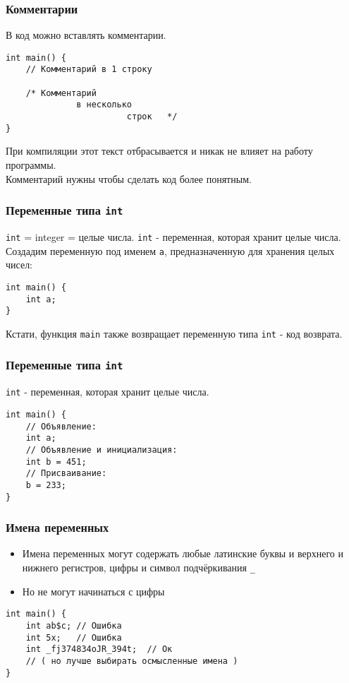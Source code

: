\documentclass[12pt,pdf,hyperref={unicode}]{beamer}
\begin{document}
\begin{frame}[fragile]
\frametitle{Комментарии}
В код можно вставлять комментарии.
\begin{lstlisting}
int main() {
	// Комментарий в 1 строку
	
	/* Комментарий
	          в несколько
	                    строк   */ 
}
\end{lstlisting}
При компиляции этот текст отбрасывается и никак не влияет на работу программы. \\
Комментарий нужны чтобы сделать код более понятным.
\end{frame}

\begin{frame}[fragile]
\frametitle{Переменные типа \texttt{int}}
\texttt{int} = integer = целые числа.
\texttt{int} - переменная, которая хранит целые числа. \\
Создадим переменную под именем \texttt{a}, предназначенную для хранения целых чисел: \\
\begin{lstlisting}
int main() {
    int a; 
}
\end{lstlisting}
Кстати, функция \texttt{main} также возвращает переменную типа \texttt{int} - код возврата.
\end{frame}

\begin{frame}[fragile]
\frametitle{Переменные типа \texttt{int}}
\texttt{int} - переменная, которая хранит целые числа.
\begin{lstlisting}
int main() {
    // Объявление:
    int a; 
    // Объявление и инициализация:
    int b = 451; 
    // Присваивание:
    b = 233;
}
\end{lstlisting}
\end{frame}

\begin{frame}[fragile]
\frametitle{Имена переменных}
\begin{itemize}
\item Имена переменных могут содержать любые латинские буквы и верхнего и нижнего регистров, цифры и символ подчёркивания \texttt{\_}
\item Но не могут начинаться с цифры
\end{itemize}
\begin{lstlisting}
int main() {
    int ab$c; // Ошибка
    int 5x;   // Ошибка
    int _fj374834oJR_394t;  // Ок
    // ( но лучше выбирать осмысленные имена )
}
\end{lstlisting}
\end{frame}
\end{document}
